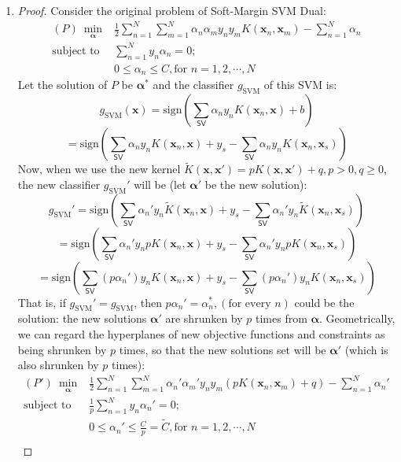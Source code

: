 \documentclass[11pt]{article}
\begin{document}
\begin{enumerate}[label=\textbf{\arabic*}.]
	\item \begin{proof}
	Consider the original problem of Soft-Margin SVM Dual:
	\[\begin{array}{rl} (P)\ \underset{\bm{\alpha}}\min & \frac{1}{2} \sum_{n=1}^N \sum_{m=1}^N \alpha_n \alpha_m y_n y_m K(\mathbf{x}_n, \mathbf{x}_m) - \sum_{n=1}^N \alpha_n \\
	\text{subject to} & \sum_{n=1}^N y_n \alpha_n = 0; \\
	& 0 \leq \alpha_n \leq C, \text{for } n=1, 2, \cdots , N
	\end{array}\]
	Let the solution of $P$ be $\bm{\alpha^*}$ and the classifier $g_{\mathrm{SVM}}$ of this SVM is:
	\[g_{\mathrm{SVM}}(\mathbf{x}) = \text{sign}\left( \sum_{\mathsf{SV}}\alpha_n y_n K(\mathbf{x}_n, \mathbf{x}) + b \right)\]
	\[ = \text{sign}\left( \sum_{\mathsf{SV}}\alpha_n y_n K(\mathbf{x}_n, \mathbf{x}) +y_s - \sum_{\mathsf{SV}}\alpha_n y_n K(\mathbf{x}_n, \mathbf{x}_s) \right)\]
	Now, when we use the new kernel $\tilde{K}(\mathbf{x}, \mathbf{x'}) = pK(\mathbf{x}, \mathbf{x'})+q, p>0, q\geq 0$, the new classifier $g_{\mathrm{SVM}}'$ will be (let $\bm{\alpha'}$ be the new solution):
	\[g_{\mathrm{SVM}}' = \text{sign}\left( \sum_{\mathsf{SV}}\alpha_n' y_n \tilde{K}(\mathbf{x}_n, \mathbf{x}) +y_s - \sum_{\mathsf{SV}}\alpha_n' y_n \tilde{K}(\mathbf{x}_n, \mathbf{x}_s) \right)\]
	\[ = \text{sign}\left( \sum_{\mathsf{SV}}\alpha_n' y_n pK(\mathbf{x}_n, \mathbf{x}) +y_s - \sum_{\mathsf{SV}}\alpha_n' y_n pK(\mathbf{x}_n, \mathbf{x}_s) \right)\]
	\[ = \text{sign}\left( \sum_{\mathsf{SV}}(p\alpha_n') y_n K(\mathbf{x}_n, \mathbf{x}) +y_s - \sum_{\mathsf{SV}}(p\alpha_n') y_n K(\mathbf{x}_n, \mathbf{x}_s) \right)\]
	That is, if $g_{\mathrm{SVM}}' = g_{\mathrm{SVM}}$, then $p\alpha_n' = \alpha_n^*, (\text{for every } n)$ could be the solution: the new solutions  $\bm{\alpha'}$ are shrunken by $p$ times from $\bm{\alpha}$. Geometrically, we can regard the hyperplanes of new objective functions and constraints as being shrunken by $p$ times, so that the new solutions set will be $\bm{\alpha'}$ (which is also shrunken by $p$ times):
	\[\begin{array}{rl} (P')\ \underset{\bm{\alpha}}\min & \frac{1}{2} \sum_{n=1}^N \sum_{m=1}^N \alpha_n' \alpha_m' y_n y_m (pK(\mathbf{x}_n, \mathbf{x}_m)+q) - \sum_{n=1}^N \alpha_n'  \\
	\text{subject to} & \frac{1}{p}\sum_{n=1}^N y_n \alpha_n' = 0; \\
	& 0 \leq \alpha_n' \leq \frac{C}{p} = \tilde{C}, \text{for } n=1, 2, \cdots , N\\

\end{array}\]
\end{proof}
\end{enumerate}
\end{document}
